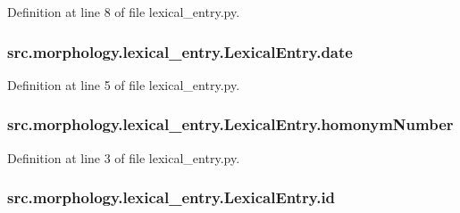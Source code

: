 Definition at line 8 of file lexical\+\_\+entry.\+py.

\hypertarget{classsrc_1_1morphology_1_1lexical__entry_1_1_lexical_entry_a81adbcf29b6f46f2dfc0b0d70c76976a}{
\subsubsection[{date}]{\setlength{\rightskip}{0pt plus 5cm}src.\+morphology.\+lexical\+\_\+entry.\+Lexical\+Entry.\+date}}\label{classsrc_1_1morphology_1_1lexical__entry_1_1_lexical_entry_a81adbcf29b6f46f2dfc0b0d70c76976a}


Definition at line 5 of file lexical\+\_\+entry.\+py.

\hypertarget{classsrc_1_1morphology_1_1lexical__entry_1_1_lexical_entry_a10efca66a6d3066da5a9d6335055a90c}{
\subsubsection[{homonym\+Number}]{\setlength{\rightskip}{0pt plus 5cm}src.\+morphology.\+lexical\+\_\+entry.\+Lexical\+Entry.\+homonym\+Number}}\label{classsrc_1_1morphology_1_1lexical__entry_1_1_lexical_entry_a10efca66a6d3066da5a9d6335055a90c}


Definition at line 3 of file lexical\+\_\+entry.\+py.

\hypertarget{classsrc_1_1morphology_1_1lexical__entry_1_1_lexical_entry_aad3078c80b6b064a508751c4a5252fb1}{
\subsubsection[{id}]{\setlength{\rightskip}{0pt plus 5cm}src.\+morphology.\+lexical\+\_\+entry.\+Lexical\+Entry.\+id}}\label{classsrc_1_1morphology_1_1lexical__entry_1_1_lexical_entry_aad3078c80b6b064a508751c4a5252fb1}


